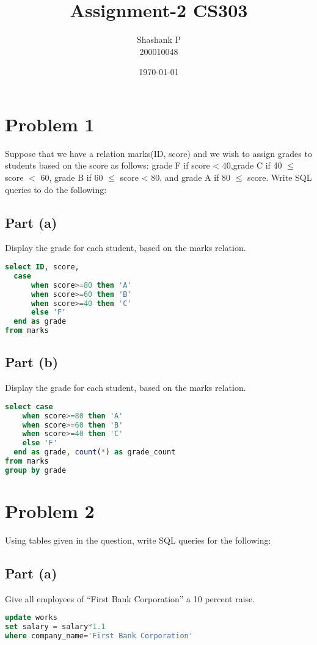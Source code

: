 \documentclass{article}
\title{Assignment-2 CS303}
\author{Shashank P \\ 200010048}
\date{\today}
\begin{document}
\maketitle




\section{Problem 1}
Suppose that we have a relation marks(ID, score) and we wish to assign grades to students based on the
score as follows: grade F if score < 40,grade C if 40 $\leq$ score $<$ 60, grade B if 60 $\leq$ score < 80, and grade
A if 80 $\leq$ score. Write SQL queries to do the following:
\subsection{Part (a)}
Display the grade for each student, based on the marks relation.
\begin{lstlisting}[language=sql]
select ID, score,
  case 
      when score>=80 then 'A'
      when score>=60 then 'B'
      when score>=40 then 'C'
      else 'F'
  end as grade
from marks
\end{lstlisting}

\subsection{Part (b)}
Display the grade for each student, based on the marks relation.
\begin{lstlisting}[language=sql]
select case 
    when score>=80 then 'A'
    when score>=60 then 'B'
    when score>=40 then 'C'
    else 'F'
  end as grade, count(*) as grade_count
from marks
group by grade
\end{lstlisting}

\section{Problem 2}
Using tables given in the question, write SQL queries for the following:
\subsection{Part (a)}
Give all employees of “First Bank Corporation” a 10 percent raise.
\begin{lstlisting}[language=sql]
update works
set salary = salary*1.1
where company_name='First Bank Corporation'
\end{lstlisting}
\end{document}
